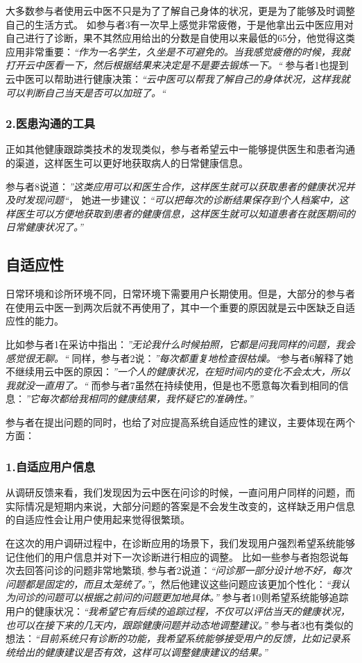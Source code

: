 大多数参与者使用云中医不只是为了了解自己身体的状况，更是为了能够及时调整自己的生活方式。
如参与者3有一次早上感觉非常疲倦，于是他拿出云中医应用对自己进行了诊断，果不其然应用给出的分数是自使用以来最低的65分，他觉得这类应用非常重要：\textit{“作为一名学生，久坐是不可避免的。当我感觉疲倦的时候，我就打开云中医看一下，然后根据结果来决定是不是要去锻炼一下。“}
参与者1也提到云中医可以帮助进行健康决策：\textit{“云中医可以帮我了解自己的身体状况，这样我就可以判断自己当天是否可以加班了。“}


\subsubsection{2.医患沟通的工具}

正如其他健康跟踪类技术的发现类似，参与者希望云中一能够提供医生和患者沟通的渠道，这样医生可以更好地获取病人的日常健康信息。

参与者8说道：\textit{”这类应用可以和医生合作，这样医生就可以获取患者的健康状况并及时发现问题“}， 她进一步建议：\textit{“可以把每次的诊断结果保存到个人档案中，这样医生可以方便地获取到患者的健康信息，这样医生就可以知道患者在就医期间的日常健康状况了。”}

\subsection{自适应性}
日常环境和诊所环境不同，日常环境下需要用户长期使用。但是，大部分的参与者在使用云中医一到两次后就不再使用了，其中一个重要的原因就是云中医缺乏自适应性的能力。

比如参与者1在采访中指出：\textit{”无论我什么时候拍照，它都是问我同样的问题，我会感觉很无聊。“}
同样，参与者2说：\textit{”每次都重复地检查很枯燥。“}参与者6解释了她不继续用云中医的原因：\textit{”一个人的健康状况，在短时间内的变化不会太大，所以我就没一直用了。“}
而参与者7虽然在持续使用，但是也不愿意每次看到相同的信息：\textit{”它每次都给我相同的健康结果，我怀疑它的准确性。”}

参与者在提出问题的同时，也给了对应提高系统自适应性的建议，主要体现在两个方面：

\subsubsection{1.自适应用户信息}

从调研反馈来看，我们发现因为云中医在问诊的时候，一直问用户同样的问题，而实际情况是短期内来说，大部分问题的答案是不会发生改变的，这样缺乏用户信息的自适应性会让用户使用起来觉得很繁琐。

在这次的用户调研过程中，在诊断应用的场景下，我们发现用户强烈希望系统能够记住他们的用户信息并对下一次诊断进行相应的调整。
比如一些参与者抱怨说每次去回答问诊的问题非常地繁琐, 参与者2说道：\textit{“问诊那一部分设计地不好，每次问题都是固定的，而且太笼统了。”}，然后他建议这些问题应该更加个性化：\textit{“我认为问诊的问题可以根据之前问的问题更加地具体。”}
参与者10则希望系统能够追踪用户的健康状况：\textit{“我希望它有后续的追踪过程，不仅可以评估当天的健康状况，也可以在接下来的几天内，跟踪健康问题并动态地调整建议。”}
参与者3也有类似的想法：\textit{“目前系统只有诊断的功能，我希望系统能够接受用户的反馈，比如记录系统给出的健康建议是否有效，这样可以调整健康建议的结果。”}

